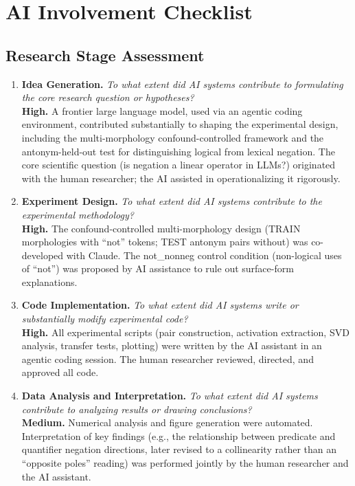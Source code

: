 
\section*{AI Involvement Checklist}

\subsection*{Research Stage Assessment}

\begin{enumerate}

\item \textbf{Idea Generation.}
\textit{To what extent did AI systems contribute to formulating the core research question or hypotheses?} \\
\textbf{High.} A frontier large language model, used via an agentic coding environment, contributed substantially to shaping the experimental design, including the multi-morphology confound-controlled framework and the antonym-held-out test for distinguishing logical from lexical negation. The core scientific question (is negation a linear operator in LLMs?) originated with the human researcher; the AI assisted in operationalizing it rigorously.

\item \textbf{Experiment Design.}
\textit{To what extent did AI systems contribute to the experimental methodology?} \\
\textbf{High.} The confound-controlled multi-morphology design (TRAIN morphologies with ``not'' tokens; TEST antonym pairs without) was co-developed with Claude. The not\_nonneg control condition (non-logical uses of ``not'') was proposed by AI assistance to rule out surface-form explanations.

\item \textbf{Code Implementation.}
\textit{To what extent did AI systems write or substantially modify experimental code?} \\
\textbf{High.} All experimental scripts (pair construction, activation extraction, SVD analysis, transfer tests, plotting) were written by the AI assistant in an agentic coding session. The human researcher reviewed, directed, and approved all code.

\item \textbf{Data Analysis and Interpretation.}
\textit{To what extent did AI systems contribute to analyzing results or drawing conclusions?} \\
\textbf{Medium.} Numerical analysis and figure generation were automated. Interpretation of key findings (e.g., the relationship between predicate and quantifier negation directions, later revised to a collinearity rather than an ``opposite poles'' reading) was performed jointly by the human researcher and the AI assistant.


\end{enumerate}
